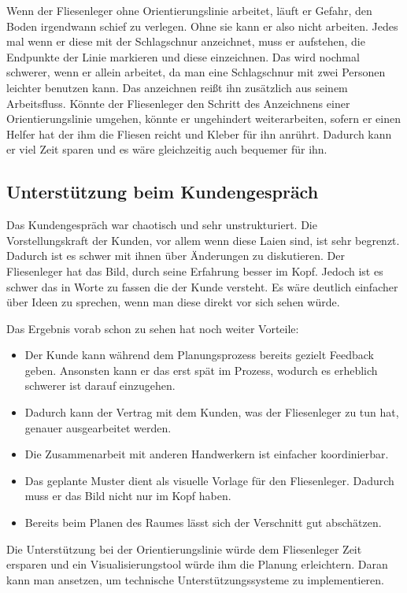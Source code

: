 Wenn der Fliesenleger ohne Orientierungslinie arbeitet, läuft er Gefahr, den Boden irgendwann schief zu verlegen. Ohne sie kann er also nicht arbeiten. Jedes mal wenn er diese mit der Schlagschnur anzeichnet, muss er aufstehen, die Endpunkte der Linie markieren und diese einzeichnen. Das wird nochmal schwerer, wenn er allein arbeitet, da man eine Schlagschnur mit zwei Personen leichter benutzen kann. Das anzeichnen reißt ihn zusätzlich aus seinem Arbeitsfluss. Könnte der Fliesenleger den Schritt des Anzeichnens einer Orientierungslinie umgehen, könnte er ungehindert weiterarbeiten, sofern er einen Helfer hat der ihm die Fliesen reicht und Kleber für ihn anrührt. Dadurch kann er viel Zeit sparen und es wäre gleichzeitig auch bequemer für ihn.

\subsection{Unterstützung beim Kundengespräch}

Das Kundengespräch war chaotisch und sehr unstrukturiert. Die Vorstellungskraft der Kunden, vor allem wenn diese Laien sind, ist sehr begrenzt. Dadurch ist es schwer mit ihnen über Änderungen zu diskutieren. Der Fliesenleger hat das Bild, durch seine Erfahrung besser im Kopf. Jedoch ist es schwer das in Worte zu fassen die der Kunde versteht. Es wäre deutlich einfacher über Ideen zu sprechen, wenn man diese direkt vor sich sehen würde.

Das Ergebnis vorab schon zu sehen hat noch weiter Vorteile:

\begin{itemize}
	\item Der Kunde kann während dem Planungsprozess bereits gezielt Feedback geben. Ansonsten kann er das erst spät im Prozess, wodurch es erheblich schwerer ist darauf einzugehen.
	\item Dadurch kann der Vertrag mit dem Kunden, was der Fliesenleger zu tun hat, genauer ausgearbeitet werden.
	\item Die Zusammenarbeit mit anderen Handwerkern ist einfacher koordinierbar.
	\item Das geplante Muster dient als visuelle Vorlage für den Fliesenleger. Dadurch muss er das Bild nicht nur im Kopf haben.
	\item Bereits beim Planen des Raumes lässt sich der Verschnitt gut abschätzen.
\end{itemize}

Die Unterstützung bei der Orientierungslinie würde dem Fliesenleger Zeit ersparen und ein Visualisierungstool würde ihm die Planung erleichtern. Daran kann man ansetzen, um technische Unterstützungssysteme zu implementieren.
